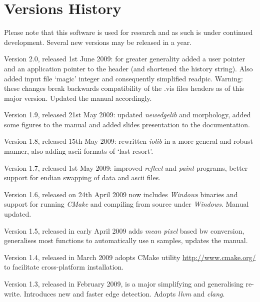 \documentclass[11pt,twoside,english,a4paper]{article}
\begin{document}
\section{Versions History} 
Please note that this software is used for research and as such is
under continued development. Several new versions may be released in a year. 
\begin{description}
\item {Version 2.0}, released 1st June 2009: for greater generality added a user pointer and an application pointer to the header (and shortened the history string). Also added input file `magic' integer and consequently simplified readpic.
Warning: these changes break backwards compatibility of the  .vis files headers as of this major version. 
Updated the manual accordingly.
\item {Version 1.9}, released 21st May 2009: updated \emph{newedgelib} and morphology, added some figures to the manual and added slides presentation to the documentation.
\item {Version 1.8}, released 15th May 2009: rewritten \emph{iolib} in a more general and robust manner, also adding ascii formats of `last resort'. 
\item {Version 1.7}, released 1st May 2009: improved \emph{reflect} and \emph{paint} programs, better support
for endian swapping of data and ascii files.
\item {Version 1.6}, released on 24th April 2009 now includes  \emph{Windows} binaries and support for
running \emph{CMake} and compiling from source under \emph{Windows}. Manual updated.
\item {Version 1.5}, released in early April 2009 adds \emph{mean pixel} based bw conversion, generalises
most functions to automatically use n samples, updates the manual.
\item {Version 1.4}, released in March 2009 adopts CMake utility \url{http://www.cmake.org/}
to facilitate cross-platform installation.
\item {Version 1.3}, released in February 2009, is a major simplifying and 
generalising re-write. Introduces new and faster edge detection. Adopts \emph{llvm} and \emph{clang}.
\end{description}
\end{document}
